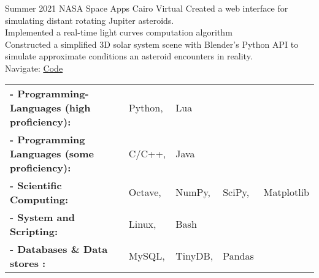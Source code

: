 \documentclass[hidelinks]{report}
\begin{document}
\entry
    {Summer 2021}
    {NASA Space Apps Cairo}
    {Virtual} 
    {}
    {
      \textbullet Created a web interface for simulating distant rotating Jupiter asteroids.\\
      \textbullet Implemented a real-time light curves computation algorithm \\
      \textbullet Constructed a simplified 3D solar system scene with Blender's Python API to simulate approximate conditions an asteroid encounters in reality. \\
      \textbullet Navigate: \href{\github/Asteroid-Bent}{\underline{Code}}
    }

\vspace{2mm}
    


\begin{tabular}{ l l l l l}
      \bf{- Programming-Languages (high proficiency):} & Python, & Lua \\ 
      \bf{- Programming Languages (some proficiency):} & C/C++, & Java \\ 
      \bf{- Scientific Computing:} & Octave, & NumPy, & SciPy, & Matplotlib \\ 
      \bf{- System and Scripting:} & Linux, & Bash \\ 
      \bf{- Databases \& Data stores :} & MySQL, & TinyDB, & Pandas \\ 
       
\end{tabular}
\end{document}
